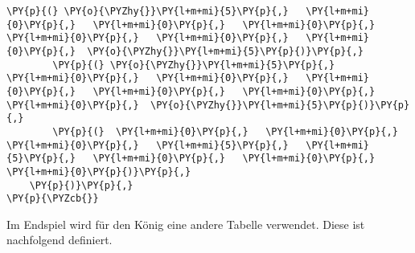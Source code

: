 \begin{tcolorbox}[fontupper=\linespread{.66}\selectfont, breakable, size=fbox, boxrule=1pt, pad at break*=1mm,colback=cellbackground, colframe=cellborder]
\begin{Verbatim}[commandchars=\\\{\}]
        \PY{p}{(} \PY{o}{\PYZhy{}}\PY{l+m+mi}{5}\PY{p}{,}   \PY{l+m+mi}{0}\PY{p}{,}   \PY{l+m+mi}{0}\PY{p}{,}   \PY{l+m+mi}{0}\PY{p}{,}   \PY{l+m+mi}{0}\PY{p}{,}   \PY{l+m+mi}{0}\PY{p}{,}   \PY{l+m+mi}{0}\PY{p}{,}  \PY{o}{\PYZhy{}}\PY{l+m+mi}{5}\PY{p}{)}\PY{p}{,}
        \PY{p}{(} \PY{o}{\PYZhy{}}\PY{l+m+mi}{5}\PY{p}{,}   \PY{l+m+mi}{0}\PY{p}{,}   \PY{l+m+mi}{0}\PY{p}{,}   \PY{l+m+mi}{0}\PY{p}{,}   \PY{l+m+mi}{0}\PY{p}{,}   \PY{l+m+mi}{0}\PY{p}{,}   \PY{l+m+mi}{0}\PY{p}{,}  \PY{o}{\PYZhy{}}\PY{l+m+mi}{5}\PY{p}{)}\PY{p}{,}
        \PY{p}{(}  \PY{l+m+mi}{0}\PY{p}{,}   \PY{l+m+mi}{0}\PY{p}{,}   \PY{l+m+mi}{0}\PY{p}{,}   \PY{l+m+mi}{5}\PY{p}{,}   \PY{l+m+mi}{5}\PY{p}{,}   \PY{l+m+mi}{0}\PY{p}{,}   \PY{l+m+mi}{0}\PY{p}{,}   \PY{l+m+mi}{0}\PY{p}{)}\PY{p}{,}
    \PY{p}{)}\PY{p}{,}
\PY{p}{\PYZcb{}}
\end{Verbatim}
\end{tcolorbox}

    Im Endspiel wird für den König eine andere Tabelle verwendet. Diese ist
nachfolgend definiert.

\bigskip

